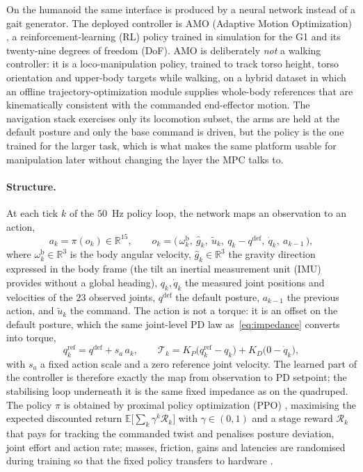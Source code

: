 \documentclass[11pt,a4paper]{article}
\newcommand{\R}{\mathbb{R}}
\newcommand{\qdef}{q^{\mathrm{def}}}
\begin{document}
On the humanoid the same interface is produced by a neural network instead of a gait generator. The deployed
controller is AMO (Adaptive Motion Optimization) \cite{li2025amo}, a reinforcement-learning (RL) policy
trained in simulation for the G1 and its twenty-nine degrees of freedom (DoF). AMO is deliberately \emph{not} a walking controller: it is a
loco-manipulation policy, trained to track torso height, torso orientation and upper-body targets while
walking, on a hybrid dataset in which an offline trajectory-optimization module supplies whole-body
references that are kinematically consistent with the commanded end-effector motion. The navigation stack
exercises only its locomotion subset, the arms are held at the default posture and only the base command
is driven, but the policy is the one trained for the larger task, which is what makes the same platform
usable for manipulation later without changing the layer the MPC talks to.

\paragraph{Structure.} At each tick $k$ of the $50$~Hz policy loop, the network maps an observation to an
action,
\begin{equation}
  a_k=\pi(o_k)\in\R^{15},
  \qquad
  o_k=\big(\,\omega^{\mathrm{b}}_k,\ \hat g_k,\ \tilde u_k,\ q_k-\qdef,\ \dot q_k,\ a_{k-1}\,\big),
  \label{eq:rlpolicy}
\end{equation}
where $\omega^{\mathrm{b}}_k\in\R^3$ is the body angular velocity, $\hat g_k\in\R^3$ the gravity direction
expressed in the body frame (the tilt an inertial measurement unit (IMU) provides without a global heading), $q_k,\dot q_k$ the
measured joint positions and velocities of the $23$ observed joints, $\qdef$ the default posture,
$a_{k-1}$ the previous action, and $\tilde u_k$ the command. The action is not a torque: it is an offset on
the default posture, which the same joint-level PD law as~\eqref{eq:impedance} converts into torque,
\begin{equation}
  q_k^{\mathrm{ref}}=\qdef+s_a\,a_k,
  \qquad
  \mathcal{T}_k=K_P\big(q_k^{\mathrm{ref}}-q_k\big)+K_D\big(0-\dot q_k\big),
  \label{eq:rlpd}
\end{equation}
with $s_a$ a fixed action scale and a zero reference joint velocity. The learned part of the controller is
therefore exactly the map from observation to PD setpoint; the stabilising loop underneath it is the same
fixed impedance as on the quadruped. The policy $\pi$ is obtained by proximal policy optimization (PPO)
\cite{schulman2017ppo}, maximising the expected discounted return
$\mathbb{E}\big[\sum_k\gamma^k\mathcal{R}_k\big]$ with $\gamma\in(0,1)$ and a stage reward $\mathcal{R}_k$
that pays for tracking the commanded twist and penalises posture deviation, joint effort and action rate;
masses, friction, gains and latencies are randomised during training so that the fixed policy transfers to
hardware \cite{rudin2022walk}.
\end{document}
